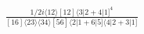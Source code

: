 \documentclass[varwidth, border=5pt]{standalone}
\begin{document}
\begin{my}
$\begin{gathered}
\scriptscriptstyle\frac{1/2i\langle12\rangle[12]\langle3|2+4|1]^4}{[16]\langle23\rangle\langle34\rangle[56]\langle2|1+6|5]\langle4|2+3|1]}
\end{gathered}$
\end{my}
\end{document}
